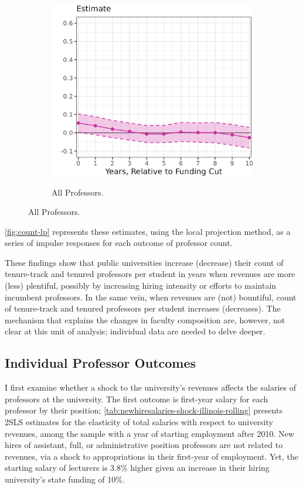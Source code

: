 \begin{figure}[h!]
\begin{subfigure}[b]{0.495\textwidth}
        \centering
        \caption{All Professors.}
        \includegraphics[width=\textwidth]{figures/all-count-lp.png}
        \label{fig:all-count-lp}
    \end{subfigure}
    \label{fig:count-lp}
\end{figure}
\autoref{fig:count-lp} represents these estimates, using the local projection method, as a series of impulse responses for each outcome of professor count.

These findings show that public universities increase (decrease) their count of tenure-track and tenured professors per student in years when revenues are more (less) plentiful, possibly by increasing hiring intensity or efforts to maintain incumbent professors.
In the same vein, when revenues are (not) bountiful, count of tenure-track and tenured professors per student increases (decreases).
The mechanism that explains the changes in faculty composition are, however, not clear at this unit of analysis; individual data are needed to delve deeper.

\subsection{Individual Professor Outcomes}
\label{sec:results-indiv}

I first examine whether a shock to the university's revenues affects the salaries of professors at the university.
The first outcome is first-year salary for each professor by their position;
\autoref{tab:newhiresalaries-shock-illinois-rolling} presents 2SLS estimates for the elasticity of total salaries with respect to university revenues, among the sample with a year of starting employment after 2010.
New hires of assistant, full, or administrative position professors are not related to revenues, via a shock to appropriations in their first-year of employment.
Yet, the starting salary of lecturers is 3.8\% higher given an increase in their hiring university's state funding of 10\%.

